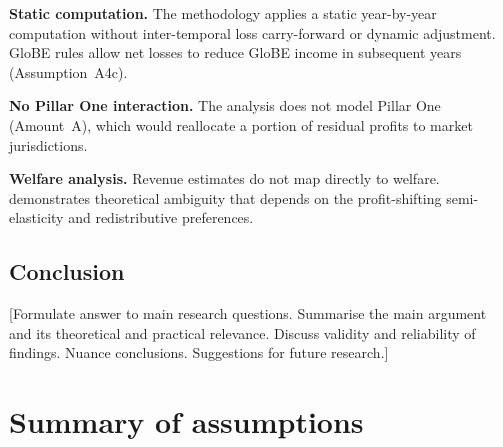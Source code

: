 \documentclass[11pt,a4paper]{article}
\begin{document}
\textbf{Static computation.} The methodology applies a static year-by-year computation without inter-temporal loss carry-forward or dynamic adjustment. GloBE rules allow net losses to reduce GloBE income in subsequent years (Assumption~A4c).

\textbf{No Pillar One interaction.} The analysis does not model Pillar One (Amount~A), which would reallocate a portion of residual profits to market jurisdictions.

\textbf{Welfare analysis.} Revenue estimates do not map directly to welfare. \citet{johannesen2022} demonstrates theoretical ambiguity that depends on the profit-shifting semi-elasticity and redistributive preferences.

\subsection{Conclusion}\label{sec:conclusion}

[Formulate answer to main research questions. Summarise the main argument and its theoretical and practical relevance. Discuss validity and reliability of findings. Nuance conclusions. Suggestions for future research.]


\newpage
\printbibliography[heading=bibintoc]


\newpage
\appendix
\renewcommand{\thesection}{\Alph{section}}
\renewcommand{\thetable}{\Alph{section}.\arabic{table}}
\renewcommand{\thefigure}{\Alph{section}.\arabic{figure}}
\renewcommand{\theequation}{\Alph{section}.\arabic{equation}}
\setcounter{table}{0}
\setcounter{figure}{0}
\setcounter{equation}{0}

\section{Summary of assumptions}\label{app:assumptions}
\setcounter{table}{0}
\end{document}

